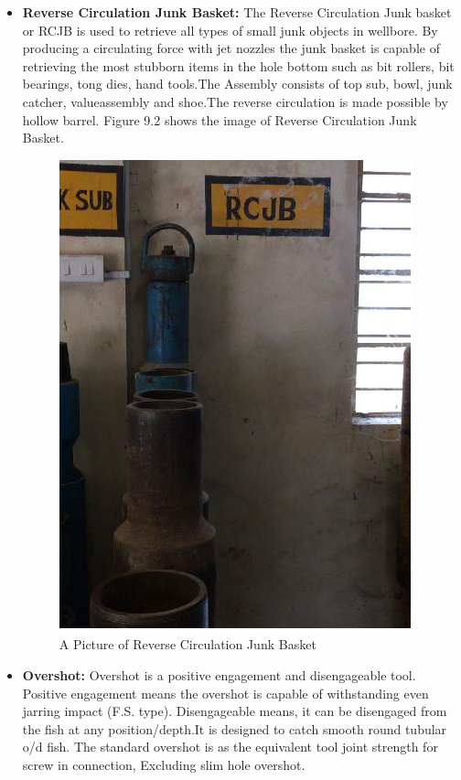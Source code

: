 \begin{itemize}
\item \textbf{Reverse Circulation Junk Basket:} The Reverse Circulation Junk
basket or RCJB is used to retrieve all types of small junk objects in
wellbore. By producing a circulating force with jet nozzles the junk
basket is capable of retrieving the most stubborn items in the hole
bottom such as bit rollers, bit bearings, tong dies, hand tools.The Assembly consists of top sub,
bowl, junk catcher, valueassembly and shoe.The reverse circulation is made possible by hollow barrel.
Figure 9.2 shows the image of Reverse Circulation Junk Basket.


\begin{figure}[h]
\includegraphics[scale=0.3]{images/RJCB}
\centering 
\caption{A Picture of Reverse Circulation Junk Basket}
\end{figure}


\item \textbf{Overshot:} Overshot is a positive engagement and disengageable tool.
Positive engagement means the overshot is capable of withstanding
even jarring impact (F.S. type). Disengageable means, it can be
disengaged from the fish at any position/depth.It is designed to catch smooth round tubular o/d fish.
The standard overshot is as the equivalent tool joint strength for screw in
connection, Excluding slim hole overshot.


\end{itemize}
